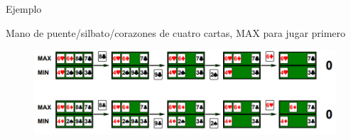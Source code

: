 \begin{frame}{Ejemplo}
    
    Mano de puente/silbato/corazones de cuatro cartas, {\selectfont MAX} para jugar primero
    
    \begin{figure}[t]
    \centering
    \includegraphics[width=12cm]{32_image_cards2.PNG}
    \end{figure}
   
\end{frame}
